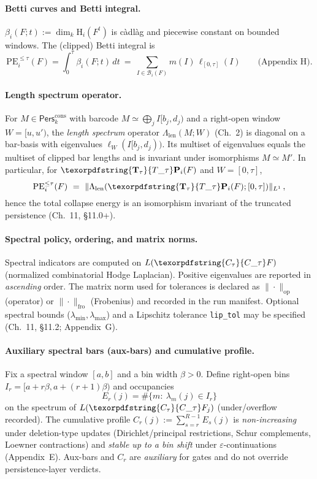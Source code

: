 \documentclass[11pt]{article}
\numberwithin{equation}{section}
\theoremstyle{plain}
\theoremstyle{definition}
\theoremstyle{remark}
\DeclareRobustCommand{\hyp}{\nobreakdash-}
\newcommand{\Pers}{\mathsf{Pers}}
\theoremstyle{plain}
\theoremstyle{definition}
\numberwithin{equation}{section}
\theoremstyle{definition}
\DeclareRobustCommand{\Perskft}{\Pers^{\mathrm{cons}}_{k}}
\DeclareRobustCommand{\Ttau}{\texorpdfstring{\ensuremath{\mathbf{T}_{\tau}}}{T\_\tau}}
\DeclareRobustCommand{\Ctau}{\texorpdfstring{\ensuremath{C_{\tau}}}{C\_\tau}}
\numberwithin{equation}{section}
\theoremstyle{plain}
\theoremstyle{definition}
\theoremstyle{remark}
\newcommand{\Len}{\Lambda_{\mathrm{len}}}
\providecommand{\Cfun}[1]{\mathsf{C}_{#1}}
\providecommand{\Tfun}[1]{\mathbf{T}_{#1}}
\providecommand{\Ctau}{\Cfun{\tau}}
\providecommand{\Ttau}{\Tfun{\tau}}
\begin{document}
\paragraph{Betti curves and Betti integral.}
\(\beta_i(F;t):=\dim_k \mathrm{H}_i(F^t)\) is c\`adl\`ag and piecewise constant on bounded windows.
The (clipped) Betti integral is
\[
\mathrm{PE}_i^{\le\tau}(F)=\int_0^\tau \beta_i(F;t)\,dt\ =\ \sum_{I\in\mathcal{B}_i(F)} m(I)\,\ell_{[0,\tau]}(I)\qquad\text{(Appendix~H).}
\]

\paragraph{Length spectrum operator.}
For \(M\in\Perskft\) with barcode \(M\simeq\bigoplus_j I[b_j,d_j)\) and a right\hyp open window \(W=[u,u')\), the \emph{length spectrum} operator \(\Len(M;W)\) (Ch.~2) is diagonal on a bar\hyp basis with eigenvalues \(\ell_W(I[b_j,d_j))\).
Its multiset of eigenvalues equals the multiset of clipped bar lengths and is invariant under isomorphisms \(M\simeq M'\).
In particular, for \(\Ttau\mathbf{P}_i(F)\) and \(W=[0,\tau]\),
\[
\mathrm{PE}_i^{\le \tau}(F)\ =\ \|\Len(\Ttau\mathbf{P}_i(F);[0,\tau])\|_{L^1}\,,
\]
hence the total collapse energy is an isomorphism invariant of the truncated persistence (Ch.~11, \S11.0+).

\paragraph{Spectral policy, ordering, and matrix norms.}
Spectral indicators are computed on \(L(\Ctau F)\) (normalized combinatorial Hodge Laplacian).
Positive eigenvalues are reported in \emph{ascending} order.
The matrix norm used for tolerances is declared as \(\|\cdot\|_{\mathrm{op}}\) (operator) or \(\|\cdot\|_{\mathrm{fro}}\) (Frobenius) and recorded in the run manifest.
Optional spectral bounds (\(\lambda_{\min},\lambda_{\max}\)) and a Lipschitz tolerance \texttt{lip\_tol} may be specified (Ch.~11, \S11.2; Appendix~G).

\paragraph{Auxiliary spectral bars (aux-bars) and cumulative profile.}
Fix a spectral window \([a,b]\) and a bin width \(\beta>0\).
Define right\hyp open bins \(I_r=[a+r\beta,a+(r+1)\beta)\) and occupancies
\[
E_r(j)=\#\{m:\ \lambda_m(j)\in I_r\}
\]
on the spectrum of \(L(\Ctau F_j)\) (under/overflow recorded).
The cumulative profile \(C_r(j):=\sum_{s=r}^{R-1}E_s(j)\) is \emph{non\hyp increasing} under deletion\hyp type updates (Dirichlet/principal restrictions, Schur complements, Loewner contractions) and \emph{stable up to a bin shift} under \(\varepsilon\)\hyp continuations (Appendix~E).
Aux-bars and \(C_r\) are \emph{auxiliary} for gates and do not override persistence\hyp layer verdicts.
\end{document}
